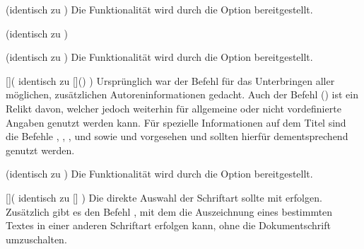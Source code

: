 \begin{Entity*}{}
\begin{Declaration}{}(identisch zu )
\printdeclarationlist%
%
Die Funktionalität wird durch die Option  bereitgestellt.
\end{Declaration}

\begin{Declaration}{}(identisch zu )
\begin{Declaration}{}(identisch zu )
\printdeclarationlist%
%
Die Funktionalität wird durch die Option  bereitgestellt.
\end{Declaration}
\end{Declaration}

\begin{Declaration}{[]}(%
  identisch zu []()%
)
\printdeclarationlist%
%
Ursprünglich war der Befehl für das Unterbringen aller möglichen, zusätzlichen 
Autoreninformationen gedacht. Auch der Befehl () ist ein 
Relikt davon, welcher jedoch weiterhin für allgemeine oder nicht vordefinierte 
Angaben genutzt werden kann. Für spezielle Informationen auf dem Titel sind die 
Befehle , , , 
 und  sowie 
 und  vorgesehen und sollten hierfür 
dementsprechend genutzt werden.
\end{Declaration}

\begin{Declaration}{}(identisch zu )
\printdeclarationlist%
%
Die Funktionalität wird durch die Option  bereitgestellt.
\end{Declaration}

\begin{Declaration}{[]}(%
  identisch zu []%
)
\printdeclarationlist%
%
Die direkte Auswahl der Schriftart sollte mit  erfolgen. 
Zusätzlich gibt es den Befehl , mit dem die Auszeichnung 
eines bestimmten Textes in einer anderen Schriftart erfolgen kann, ohne die 
Dokumentschrift umzuschalten.
\end{Declaration}
%




\end{Entity*}
